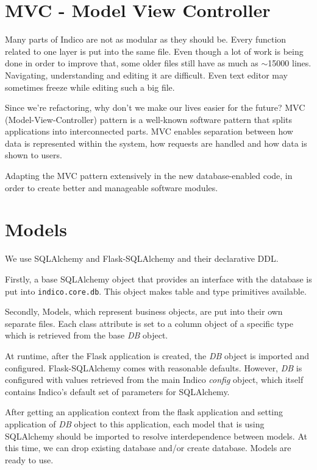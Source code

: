 \section{MVC - Model View Controller}

Many parts of Indico are not as modular as they should be. Every function related to one layer is put into the same file. Even though a lot of work is being done in order to improve that, some older files still have as much as $\sim$15000 lines. Navigating, understanding and editing it are difficult. Even text editor may sometimes freeze while editing such a big file.

Since we're refactoring, why don't we make our lives easier for the future? MVC (Model-View-Controller) pattern is a well-known software pattern that splits applications into interconnected parts. MVC enables separation between how data is represented within the system, how requests are handled and how data is shown to users.

Adapting the MVC pattern extensively in the new database-enabled code, in order to create  better and manageable software modules.

\section{Models}

We use SQLAlchemy and Flask-SQLAlchemy and their declarative DDL. 

Firstly, a base SQLAlchemy object that provides an interface with the database is put into \texttt{indico.core.db}. This object makes table and type primitives available.

Secondly, Models, which represent business objects, are put into their own separate files. Each class attribute is set to a column object of a specific type which is retrieved from the base \textit{DB} object.


At runtime, after the Flask application is created, the \textit{DB} object is imported and configured. Flask-SQLAlchemy comes with reasonable defaults. However, \textit{DB} is configured with values retrieved from the main Indico \textit{config} object, which itself contains Indico's default set of parameters for SQLAlchemy.

After getting an application context from the flask application and setting application of \textit{DB} object to this application, each model that is using SQLAlchemy should  be imported to resolve interdependence between models. At this time, we can drop existing database and/or create database. Models are ready to use.

